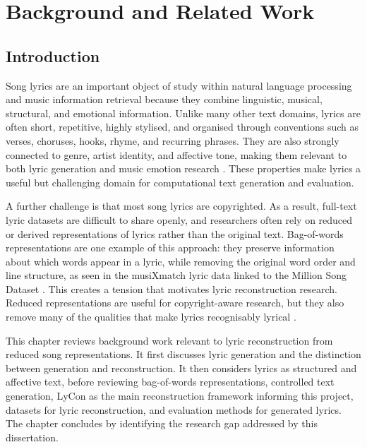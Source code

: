 \chapter{Background and Related Work}

\section{Introduction}

Song lyrics are an important object of study within natural language processing and music information retrieval because they combine linguistic, musical, structural, and emotional information. Unlike many other text domains, lyrics are often short, repetitive, highly stylised, and organised through conventions such as verses, choruses, hooks, rhyme, and recurring phrases. They are also strongly connected to genre, artist identity, and affective tone, making them relevant to both lyric generation and music emotion research \cite{zhang2020youling,delbouys2018musicmood}. These properties make lyrics a useful but challenging domain for computational text generation and evaluation.

A further challenge is that most song lyrics are copyrighted. As a result, full-text lyric datasets are difficult to share openly, and researchers often rely on reduced or derived representations of lyrics rather than the original text. Bag-of-words representations are one example of this approach: they preserve information about which words appear in a lyric, while removing the original word order and line structure, as seen in the musiXmatch lyric data linked to the Million Song Dataset \cite{bertinmahieux2011million,musixmatch2011dataset}. This creates a tension that motivates lyric reconstruction research. Reduced representations are useful for copyright-aware research, but they also remove many of the qualities that make lyrics recognisably lyrical \cite{kim2024lycon}.

This chapter reviews background work relevant to lyric reconstruction from reduced song representations. It first discusses lyric generation and the distinction between generation and reconstruction. It then considers lyrics as structured and affective text, before reviewing bag-of-words representations, controlled text generation, LyCon as the main reconstruction framework informing this project, datasets for lyric reconstruction, and evaluation methods for generated lyrics. The chapter concludes by identifying the research gap addressed by this dissertation.

